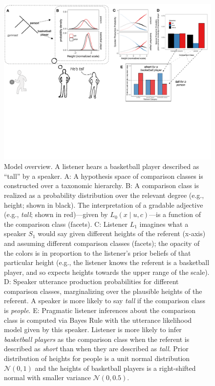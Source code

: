 \documentclass[doc]{apa6}
\begin{document}
  
\begin{figure}[ht]
\centering
\includegraphics[width=\textwidth]{figs/model_cartoon.pdf}
\caption{\small \label{fig:modelCartoon}Model overview. A listener hears a basketball player described as ``tall'' by a speaker. A: A hypothesis space of comparison classes is constructed over a taxonomic hierarchy. B: A comparison class is realized as a probability distribution over the relevant degree (e.g., height; shown in black). The interpretation of a gradable adjective (e.g., \emph{tall}; shown in red)---given by $L_{0}(x \mid u, c)$---is a function of the comparison class (facets). C: Listener $L_1$ imagines what a speaker $S_1$ would say given different heights of the referent (x-axis) and assuming different comparison classes (facets); the opacity of the colors is in proportion to the listener's prior beliefs of that particular height (e.g., the listener knows the referent is a basketball player, and so expects heights towards the upper range of the scale). D: Speaker utterance production probabilities for different comparison classes, marginalizing over the plausible heights of the referent. A speaker is more likely to say \emph{tall} if the comparison class is \emph{people}. E: Pragmatic listener inferences about the comparison class is computed via Bayes Rule with the utterance likelihood model given by this speaker. Listener is more likely to infer \emph{basketball players} as the comparison class when the referent is described as \emph{short} than when they are described as \emph{tall}. Prior distribution of heights for people is a unit normal distribution $\mathcal{N}(0, 1)$ and the heights of basketball players is a right-shifted normal with smaller variance $\mathcal{N}(0, 0.5)$.
}
\end{figure}
  
\end{document}
